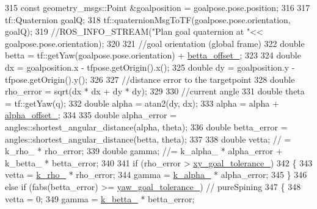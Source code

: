 \begin{DoxyCode}
{315     \textcolor{keyword}{const} geometry\_msgs::Point &goalposition = goalpose.pose.position;
316 
317     tf::Quaternion goalQ;
318     tf::quaternionMsgToTF(goalpose.pose.orientation, goalQ);
319     \textcolor{comment}{//ROS\_INFO\_STREAM("Plan goal quaternion at "<< goalpose.pose.orientation);}
320 
321     \textcolor{comment}{//goal orientation (global frame)}
322     \textcolor{keywordtype}{double} betta = tf::getYaw(goalpose.pose.orientation) + \hyperlink{classcl__move__base__z_1_1forward__local__planner_1_1ForwardLocalPlanner_a935db3e785e3276d42b34d58011e793c}{betta\_offset\_};
323 
324     \textcolor{keywordtype}{double} dx = goalposition.x - tfpose.getOrigin().x();
325     \textcolor{keywordtype}{double} dy = goalposition.y - tfpose.getOrigin().y();
326 
327     \textcolor{comment}{//distance error to the targetpoint}
328     \textcolor{keywordtype}{double} rho\_error = sqrt(dx * dx + dy * dy);
329 
330     \textcolor{comment}{//current angle}
331     \textcolor{keywordtype}{double} theta = tf::getYaw(q);
332     \textcolor{keywordtype}{double} alpha = atan2(dy, dx);
333     alpha = alpha + \hyperlink{classcl__move__base__z_1_1forward__local__planner_1_1ForwardLocalPlanner_a3d1b7e2ddf54efd67e4935875c7b6a67}{alpha\_offset\_};
334 
335     \textcolor{keywordtype}{double} alpha\_error = angles::shortest\_angular\_distance(alpha, theta);
336     \textcolor{keywordtype}{double} betta\_error = angles::shortest\_angular\_distance(betta, theta);
337 
338     \textcolor{keywordtype}{double} vetta; \textcolor{comment}{// = k\_rho\_ * rho\_error;}
339     \textcolor{keywordtype}{double} gamma; \textcolor{comment}{//= k\_alpha\_ * alpha\_error + k\_betta\_ * betta\_error;}
340 
341     \textcolor{keywordflow}{if} (rho\_error > \hyperlink{classcl__move__base__z_1_1forward__local__planner_1_1ForwardLocalPlanner_acd2ed91ee166f03faeeb9d6a4b91084b}{xy\_goal\_tolerance\_})
342     \{
343         vetta = \hyperlink{classcl__move__base__z_1_1forward__local__planner_1_1ForwardLocalPlanner_a8ad1b04b0bdaa8a7bb878f5e5cebd4f8}{k\_rho\_} * rho\_error;
344         gamma = \hyperlink{classcl__move__base__z_1_1forward__local__planner_1_1ForwardLocalPlanner_a530117a51f06e426b6aacc08bbd38fff}{k\_alpha\_} * alpha\_error;
345     \}
346     \textcolor{keywordflow}{else} \textcolor{keywordflow}{if} (fabs(betta\_error) >= \hyperlink{classcl__move__base__z_1_1forward__local__planner_1_1ForwardLocalPlanner_a7ea1ca266850c7b847a2355f489e6041}{yaw\_goal\_tolerance\_}) \textcolor{comment}{// pureSpining}
347     \{
348         vetta = 0;
349         gamma = \hyperlink{classcl__move__base__z_1_1forward__local__planner_1_1ForwardLocalPlanner_a7b89ccccd288e5384154e7d5b64b4014}{k\_betta\_} * betta\_error;
}
\end{DoxyCode}
